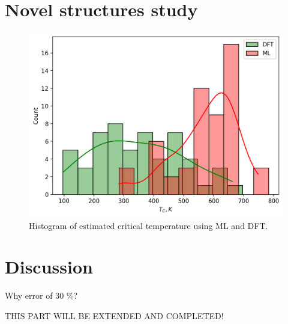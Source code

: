 \section{Novel structures study}

\begin{figure}[H]
	\centering
	\includegraphics[width=120mm]{fig/dft_fig/ml_dft_hist.png}
	\caption[Histogram of estimated critical temperature using ML and DFT.]{Histogram of estimated critical temperature using ML and DFT.}
\label{fig:dft_hist}
\end{figure}


\section{Discussion}

Why error of 30 \%?



THIS PART WILL BE EXTENDED AND COMPLETED!